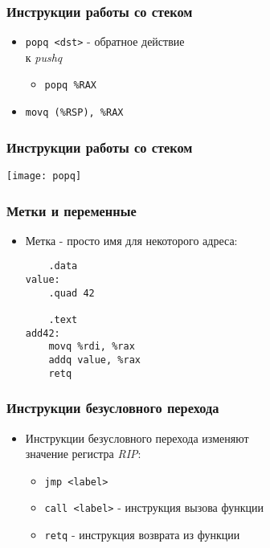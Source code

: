 \begin{frame}[fragile]
\frametitle{Инструкции работы со стеком}
\begin{itemize}
    \item<1->\lstinline|popq <dst>| - обратное действие\\
    к \emph{pushq}
    \begin{itemize}
        \item<2->\lstinline|popq %RAX|
    \end{itemize}
    \item<3->\lstinline|movq (%RSP), %RAX|
\end{itemize}
\end{frame}

\begin{frame}
\frametitle{Инструкции работы со стеком}
    \hspace*{\fill}
    \texttt{[image: popq]}
    \hspace*{\fill}\hspace*{\fill}
\end{frame}

\begin{frame}[fragile]
\frametitle{Метки и переменные}
\begin{itemize}
    \item<1->Метка - просто имя для некоторого адреса:
    \begin{lstlisting}
	.data
value:
	.quad 42

	.text
add42:
	movq %rdi, %rax
	addq value, %rax
	retq
    \end{lstlisting}
\end{itemize}
\end{frame}

\begin{frame}[fragile]
\frametitle{Инструкции безусловного перехода}
\begin{itemize}
    \item<1-> Инструкции безусловного перехода изменяют\\
    значение регистра \emph{RIP}:
    \begin{itemize}
        \item<2->\lstinline|jmp <label>|
        \item<3->\lstinline|call <label>| - инструкция вызова функции
        \item<4->\lstinline|retq| - инструкция возврата из функции
    \end{itemize}
\end{itemize}
\end{frame}

